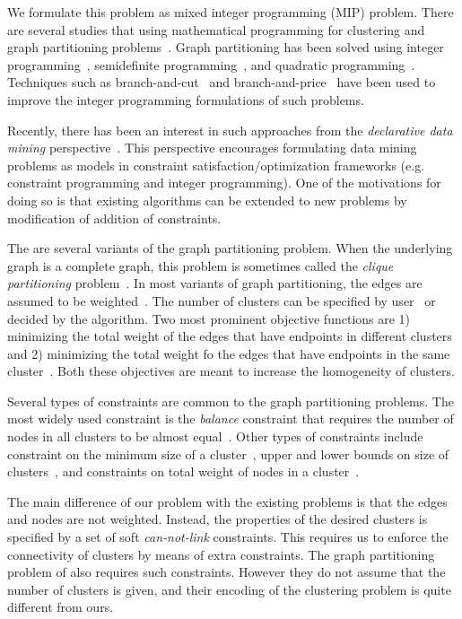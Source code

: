\documentclass[conference,compsoc]{IEEEtran}
\begin{document}
We formulate this problem as mixed integer programming (MIP)
problem. There are several studies that using mathematical programming
for clustering and graph partitioning
problems~\cite{Hansen}. Graph partitioning has been solved using integer programming~\cite{REF}, semidefinite programming~\cite{REF}, and quadratic programming~\cite{REF}. Techniques such as branch-and-cut~\cite{REF} and branch-and-price~\cite{REF} have been used to improve the integer programming formulations of such problems. 

Recently, there has been an interest in such
approaches from the \emph{declarative data mining}
perspective~\cite{vran,me}. This perspective encourages formulating
data mining problems as models in constraint satisfaction/optimization
frameworks (e.g. constraint programming and integer programming). One
of the motivations for doing so is that existing algorithms can be
extended to new problems by modification of addition of constraints.

The are several variants of the graph partitioning problem. When the underlying graph is a complete graph, this problem is sometimes called the \emph{clique partitioning} problem~\cite{REF}. In most variants of graph partitioning, the edges are assumed to be weighted~\cite{REF}. The number of clusters can be specified by user~\cite{REF} or decided by the algorithm. Two most prominent objective functions are 1) minimizing the total weight of the edges that have endpoints in different clusters~\cite{REF} and 2) minimizing the total weight fo the edges that have endpoints in the same cluster~\cite{REF}. Both these objectives are meant to increase the homogeneity of clusters.  

Several types of constraints are common to the graph partitioning problems. The most widely used constraint is the \emph{balance} constraint that requires the number of nodes in all clusters to be almost equal~\cite{REF}. Other types of constraints include constraint on the minimum size of a cluster~\cite{REF}, upper and lower bounds on size of clusters~\cite{REF}, and constraints on total weight of nodes in a cluster~\cite{REF}. 

The main difference of our problem with the existing problems is that the edges and nodes are not weighted. Instead, the properties of the desired clusters is specified by a set of soft \emph{can-not-link} constraints. This requires us to enforce the connectivity of clusters by means of extra constraints. The graph partitioning problem of \cite{connected} also requires such constraints. However they do not assume that the number of clusters is given, and their encoding of the clustering problem is quite different from ours. 
\end{document}
